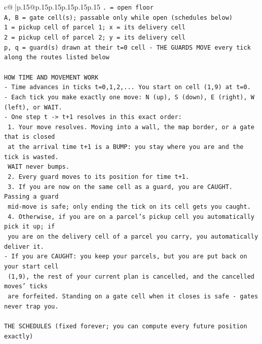 \documentclass{article}
\begin{document}
{\begin{supertabular}{c@{$\;$}|p{.15\linewidth}@{}p{.15\linewidth}p{.15\linewidth}p{.15\linewidth}p{.15\linewidth}p{.15\linewidth}}
{{{\texttt{. = open floor} \\
\texttt{A, B = gate cell(s); passable only while open (schedules below)} \\
\texttt{1 = pickup cell of parcel 1; x = its delivery cell} \\
\texttt{2 = pickup cell of parcel 2; y = its delivery cell} \\
\texttt{p, q = guard(s) drawn at their t=0 cell {-} THE GUARDS MOVE every tick along the routes listed below} \\
\\ 
\texttt{HOW TIME AND MOVEMENT WORK} \\
\texttt{{-} Time advances in ticks t=0,1,2,... You start on cell (1,9) at t=0.} \\
\texttt{{-} Each tick you make exactly one move: N (up), S (down), E (right), W (left), or WAIT.} \\
\texttt{{-} One step t {-}> t+1 resolves in this exact order:} \\
\texttt{  1. Your move resolves. Moving into a wall, the map border, or a gate that is closed} \\
\texttt{     at the arrival time t+1 is a BUMP: you stay where you are and the tick is wasted.} \\
\texttt{     WAIT never bumps.} \\
\texttt{  2. Every guard moves to its position for time t+1.} \\
\texttt{  3. If you are now on the same cell as a guard, you are CAUGHT. Passing a guard} \\
\texttt{     mid{-}move is safe; only ending the tick on its cell gets you caught.} \\
\texttt{  4. Otherwise, if you are on a parcel's pickup cell you automatically pick it up; if} \\
\texttt{     you are on the delivery cell of a parcel you carry, you automatically deliver it.} \\
\texttt{{-} If you are CAUGHT: you keep your parcels, but you are put back on your start cell} \\
\texttt{  (1,9), the rest of your current plan is cancelled, and the cancelled moves' ticks} \\
\texttt{  are forfeited. Standing on a gate cell when it closes is safe {-} gates never trap you.} \\
\\ 
\texttt{THE SCHEDULES (fixed forever; you can compute every future position exactly)} \\
}}}
\end{supertabular}}
\end{document}
